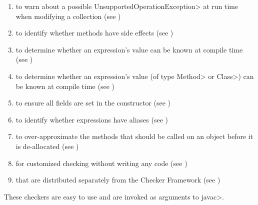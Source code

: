 \begin{enumerate}
   to
  ensure unsigned and signed values are not mixed
  (see )
\item
   to
  warn about a possible \<UnsupportedOperationException> at run time when
  modifying a collection
  (see )
\item
   to identify whether
  methods have side effects (see )
\item
   to determine
  whether an expression's value can be known at compile time
  (see )
\item
   to determine
  whether an expression's value (of type \<Method> or \<Class>) can be known at compile time
  (see )
\item
   to ensure all
  fields are set in the constructor (see
  )
\item
   to identify whether
  expressions have aliases (see )
\item
   to over-approximate the
  methods that should be called on an object before it is de-allocated (see )
\item
   for customized checking without
  writing any code (see )
\item
   that are distributed
  separately from the Checker Framework
  (see )

\end{enumerate}

\noindent
These checkers are easy to use and are invoked as arguments to \<javac>.


